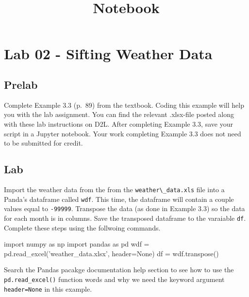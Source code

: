 \documentclass[11pt]{article}
\title{Notebook}
\newenvironment{Shaded}{}{}
\newcommand{\StringTok}[1]{\textcolor[rgb]{0.25,0.44,0.63}{{#1}}}
\newcommand{\NormalTok}[1]{{#1}}
\newcommand{\ImportTok}[1]{{#1}}
\newcommand{\VariableTok}[1]{\textcolor[rgb]{0.10,0.09,0.49}{{#1}}}
\newcommand{\OperatorTok}[1]{\textcolor[rgb]{0.40,0.40,0.40}{{#1}}}
\begin{document}
    
    
    

    
    

    
    \hypertarget{lab-02---sifting-weather-data}{%
\section{Lab 02 - Sifting Weather
Data}\label{lab-02---sifting-weather-data}}

    \hypertarget{prelab}{%
\subsection{Prelab}\label{prelab}}

Complete Example 3.3 (p.~89) from the textbook. Coding this example will
help you with the lab assignment. You can find the relevant .xlsx-file
posted along with these lab instructions on D2L. After completing
Example 3.3, save your script in a Jupyter notebook. Your work
completing Example 3.3 does not need to be submitted for credit.

    \hypertarget{lab}{%
\subsection{Lab}\label{lab}}

Import the weather data from the from the
\texttt{weather\textbackslash{}\_data.xls} file into a Panda's dataframe
called \texttt{wdf}. This time, the dataframe will contain a couple
values equal to \texttt{-99999}. Transpose the data (as done in Example
3.3) so the data for each month is in columns. Save the transposed
dataframe to the varaiable \texttt{df}. Complete these steps using the
follwoing commands.

\begin{Shaded}
\begin{Highlighting}[]
\ImportTok{import}\NormalTok{ numpy }\ImportTok{as}\NormalTok{ np}
\ImportTok{import}\NormalTok{ pandas }\ImportTok{as}\NormalTok{ pd}
\NormalTok{wdf }\OperatorTok{=}\NormalTok{ pd.read_excel(}\StringTok{'weather_data.xlsx'}\NormalTok{, header}\OperatorTok{=}\VariableTok{None}\NormalTok{)}
\NormalTok{df }\OperatorTok{=}\NormalTok{ wdf.transpose()}
\end{Highlighting}
\end{Shaded}

    Search the Pandas pacakge documentation help section to see how to use
the \texttt{pd.read\_excel()} function words and why we need the keyword
argument \texttt{header=None} in this example.
\end{document}
